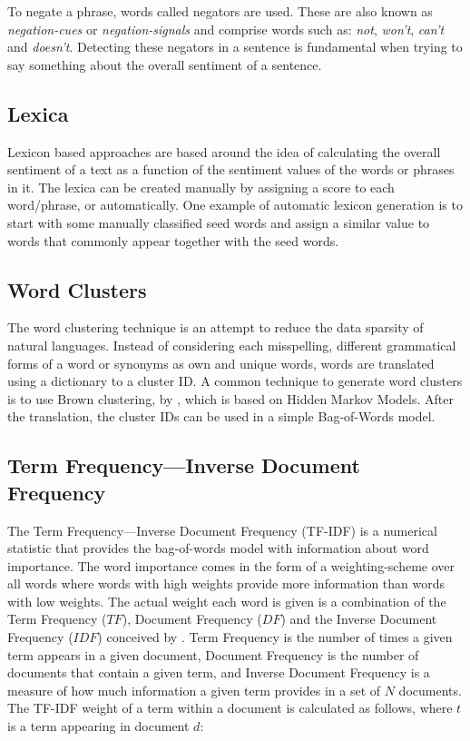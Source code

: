 To negate a phrase, words called negators are used. These are also known as \textit{negation-cues} or \textit{negation-signals} and comprise words such as: \textit{not}, \textit{won't}, \textit{can't} and \textit{doesn't}. Detecting these negators in a sentence is fundamental when trying to say something about the overall sentiment of a sentence. 

\subsection*{Lexica}
Lexicon based approaches are based around the idea of calculating the overall sentiment of a text as a function of the sentiment values of the words or phrases in it. The lexica can be created manually by assigning a score to each word/phrase, or automatically. One example of automatic lexicon generation is to start with some manually classified seed words and assign a similar value to words that commonly appear together with the seed words.

\subsection*{Word Clusters}
\label{sec:background_cluster}
The word clustering technique is an attempt to reduce the data sparsity of natural languages. Instead of considering each misspelling, different grammatical forms of a word or synonyms as own and unique words, words are translated using a dictionary to a cluster ID. A common technique to generate word clusters is to use Brown clustering, by \cite{Brown92}, which is based on Hidden Markov Models. After the translation, the cluster IDs can be used in a simple Bag-of-Words model.

\subsection{Term Frequency---Inverse Document Frequency}
\label{sec:background_tfidf}
The Term Frequency---Inverse Document Frequency (TF-IDF) is a numerical statistic that provides the bag-of-words model with information about word importance. The word importance comes in the form of a weighting-scheme over all words where words with high weights provide more information than words with low weights. The actual weight each word is given is a combination of the Term Frequency ($TF$), Document Frequency ($DF$) and the Inverse Document Frequency ($IDF$) conceived by \cite{SparckJones72}. Term Frequency is the number of times a given term appears in a given document, Document Frequency is the number of documents that contain a given term, and Inverse Document Frequency is a measure of how much information a given term provides in a set of $N$ documents. The TF-IDF weight of a term within a document is calculated as follows, where $t$ is a term appearing in document $d$: \\

